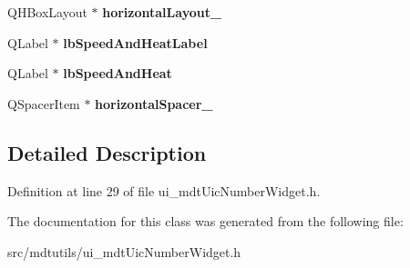 \begin{DoxyCompactItemize}
\item 
\hypertarget{class_ui__mdt_uic_number_widget_aa7c7cb7ee88ba5c8cbbefcaee910c634}{
QHBoxLayout $\ast$ {\bfseries horizontalLayout\_}}
\label{class_ui__mdt_uic_number_widget_aa7c7cb7ee88ba5c8cbbefcaee910c634}

\item 
\hypertarget{class_ui__mdt_uic_number_widget_aca809f69642289650a0c63243215c7d4}{
QLabel $\ast$ {\bfseries lbSpeedAndHeatLabel}}
\label{class_ui__mdt_uic_number_widget_aca809f69642289650a0c63243215c7d4}

\item 
\hypertarget{class_ui__mdt_uic_number_widget_a70bc0c6891d72ad06d7232cf69b3fbfb}{
QLabel $\ast$ {\bfseries lbSpeedAndHeat}}
\label{class_ui__mdt_uic_number_widget_a70bc0c6891d72ad06d7232cf69b3fbfb}

\item 
\hypertarget{class_ui__mdt_uic_number_widget_a5cb47764864d494ac4ca71097aa5ebe1}{
QSpacerItem $\ast$ {\bfseries horizontalSpacer\_}}
\label{class_ui__mdt_uic_number_widget_a5cb47764864d494ac4ca71097aa5ebe1}

\end{DoxyCompactItemize}


\subsection{Detailed Description}


Definition at line 29 of file ui\_\-mdtUicNumberWidget.h.



The documentation for this class was generated from the following file:\begin{DoxyCompactItemize}
\item 
src/mdtutils/ui\_\-mdtUicNumberWidget.h\end{DoxyCompactItemize}
